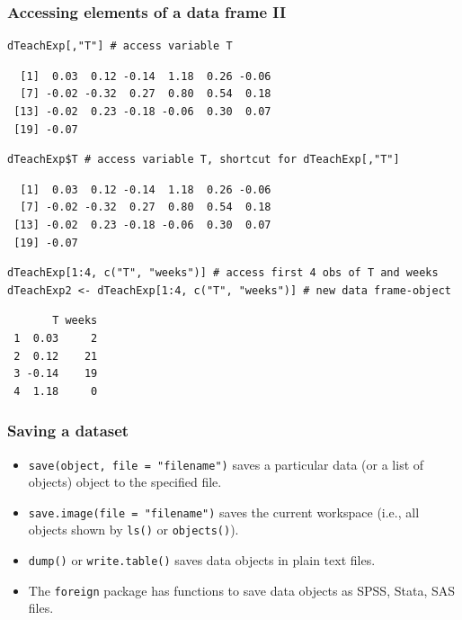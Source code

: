 \documentclass[bigger]{beamer}
\begin{document}
\begin{frame}[fragile,shrink=30]
\frametitle{Accessing elements of a data frame II}
\label{sec-3-1-7}



\lstset{language=R}
\begin{lstlisting}
dTeachExp[,"T"] # access variable T
\end{lstlisting}

\begin{verbatim}
  [1]  0.03  0.12 -0.14  1.18  0.26 -0.06
  [7] -0.02 -0.32  0.27  0.80  0.54  0.18
 [13] -0.02  0.23 -0.18 -0.06  0.30  0.07
 [19] -0.07
\end{verbatim}


\lstset{language=R}
\begin{lstlisting}
dTeachExp$T # access variable T, shortcut for dTeachExp[,"T"]
\end{lstlisting}

\begin{verbatim}
  [1]  0.03  0.12 -0.14  1.18  0.26 -0.06
  [7] -0.02 -0.32  0.27  0.80  0.54  0.18
 [13] -0.02  0.23 -0.18 -0.06  0.30  0.07
 [19] -0.07
\end{verbatim}


\lstset{language=R}
\begin{lstlisting}
dTeachExp[1:4, c("T", "weeks")] # access first 4 obs of T and weeks
dTeachExp2 <- dTeachExp[1:4, c("T", "weeks")] # new data frame-object
\end{lstlisting}

\begin{verbatim}
       T weeks
 1  0.03     2
 2  0.12    21
 3 -0.14    19
 4  1.18     0
\end{verbatim}
\end{frame}
\begin{frame}
\frametitle{Saving a dataset}
\label{sec-3-1-8}

\begin{itemize}
\item \texttt{save(object, file = "filename")} saves a particular data (or a list of objects) object to the
      specified file.
\item \texttt{save.image(file = "filename")} saves the current workspace (i.e., all objects shown by \texttt{ls()} or
      \texttt{objects()}).
\item \texttt{dump()} or \texttt{write.table()} saves data objects in plain text files.
\item The \texttt{foreign} package has functions to save data objects as SPSS, Stata, SAS files.
\end{itemize}
\end{frame}
\end{document}
